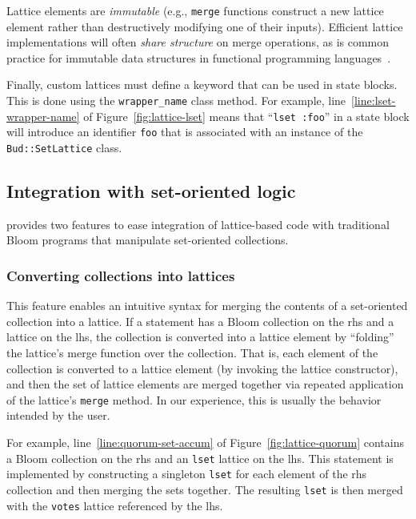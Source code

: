 Lattice elements are \emph{immutable} (e.g., \texttt{merge} functions construct
a new lattice element rather than destructively modifying one of their
inputs). Efficient lattice implementations will often \emph{share structure} on merge
operations, as is common practice for immutable data structures in functional
programming languages~\cite{Okasaki1999}. %

Finally, custom lattices must define a keyword that can be used in \lang state
blocks. This is done using the \texttt{wrapper\_name} class method. For example,
line~\ref{line:lset-wrapper-name} of Figure~\ref{fig:lattice-lset} means that
``\texttt{lset :foo}'' in a \lang state block will introduce an identifier
\texttt{foo} that is associated with an instance of the \texttt{Bud::SetLattice}
class.

\subsection{Integration with set-oriented logic}
\label{sec:bloom-interop}
\lang provides two features to ease integration of lattice-based code with
traditional Bloom programs that manipulate set-oriented collections.

\subsubsection{Converting collections into lattices}
This feature enables an intuitive syntax for merging the contents of a
set-oriented collection into a lattice. If a statement has a Bloom collection on
the rhs and a lattice on the lhs, the collection is converted into a lattice
element by ``folding'' the lattice's merge function over the collection. That
is, each element of the collection is converted to a lattice element (by
invoking the lattice constructor), and then the set of lattice elements are
merged together via repeated application of the lattice's \texttt{merge}
method. In our experience, this is usually the behavior intended by the user.

For example, line~\ref{line:quorum-set-accum} of Figure~\ref{fig:lattice-quorum}
contains a Bloom collection on the rhs and an \texttt{lset} lattice on the
lhs. This statement is implemented by constructing a singleton \texttt{lset} for
each element of the rhs collection and then merging the sets together. The
resulting \texttt{lset} is then merged with the \texttt{votes} lattice
referenced by the lhs.

